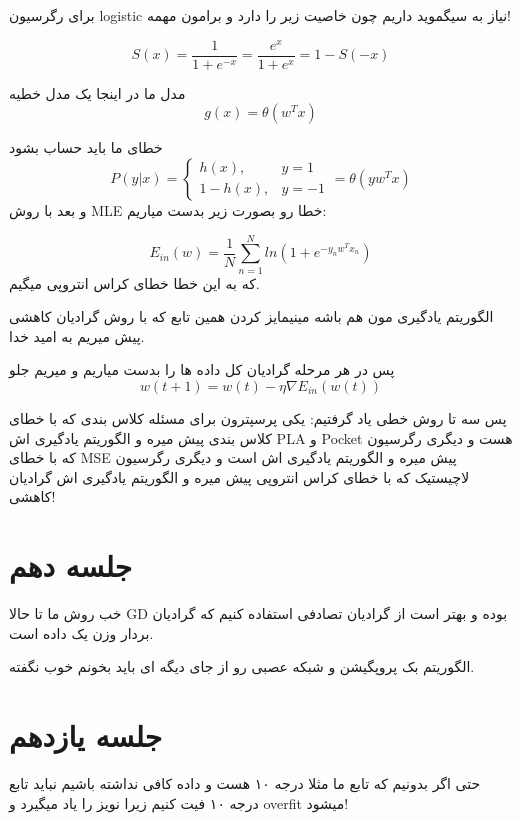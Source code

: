 \documentclass[twocolumn,11pt]{article}
\begin{document}
برای رگرسیون logistic نیاز به سیگموید داریم چون خاصیت زیر را دارد و برامون مهمه!

\begin{equation}
S(x) = \frac{1}{1+e^{-x}} = 
\frac{e^x}{1+e^x} = 1-S(-x)
\end{equation}

مدل ما در اینجا یک مدل خطیه
\begin{equation}
g(x) = \theta(w^T x) 
\end{equation}

خطای ما باید حساب بشود
\begin{equation}
P(y|x) = 
\begin{cases}
h(x), &y=1 \\
1-h(x), &y=-1
\end{cases} = 
\theta(y w^T x) 
\end{equation}
و بعد با روش MLE
خطا رو بصورت زیر بدست میاریم:

\begin{equation}
E_{in}(w) = \frac{1}{N} \sum_{n=1}^N 
ln(1+e^ {-y_n w^T x_n}) 
\end{equation}
که به این خطا خطای کراس انتروپی میگیم.

الگوریتم یادگیری مون هم باشه مینیمایز کردن همین تابع که با روش گرادیان کاهشی پیش میریم به امید خدا.

پس در هر مرحله گرادیان کل داده ها را بدست میاریم و میریم جلو
\begin{equation}
w(t+1) = w(t) - \eta \nabla E_{in}(w(t))
\end{equation}

پس سه تا روش خطی یاد گرفتیم:
یکی پرسپترون برای مسئله کلاس بندی که با خطای کلاس بندی پیش میره و الگوریتم یادگیری اش PLA
و Pocket 
هست
 و دیگری رگرسیون که با خطای MSE
پیش میره و الگوریتم یادگیری اش
است
و دیگری رگرسیون لاچیستیک که با خطای کراس انتروپی پیش میره
و الگوریتم یادگیری اش گرادیان کاهشی!

\section{جلسه دهم}
خب روش ما تا حالا GD بوده و بهتر است از گرادیان تصادفی استفاده کنیم که گرادیان بردار وزن یک داده است. 

الگوریتم بک پروپگیشن و شبکه عصبی رو از جای دیگه ای باید بخونم خوب نگفته. 
\section{جلسه یازدهم}

حتی اگر بدونیم که تابع ما مثلا درجه ۱۰ هست و داده کافی نداشته باشیم نباید تابع درجه ۱۰ فیت کنیم زیرا نویز را یاد میگیرد و overfit میشود! 
\end{document}
